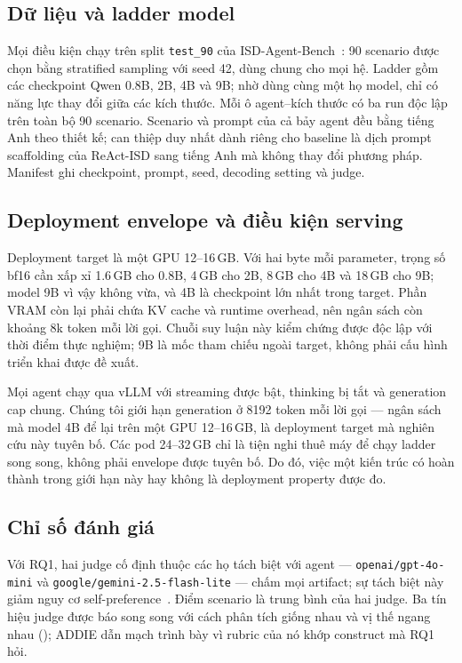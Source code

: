 \subsection{Dữ liệu và ladder model}
\label{sec:dataset}
\label{sec:setup}

Mọi điều kiện chạy trên split \texttt{test\_90} của
ISD-Agent-Bench~\cite{isdagentbench}: 90 scenario được chọn bằng stratified
sampling với seed 42, dùng chung cho mọi hệ. Ladder gồm các checkpoint Qwen
0.8B, 2B, 4B và 9B; nhờ dùng cùng một họ model, chỉ có năng lực thay đổi giữa các
kích thước. Mỗi ô agent--kích thước có ba run độc lập trên toàn bộ 90 scenario.
Scenario và prompt của cả bảy agent đều bằng tiếng Anh theo thiết kế; can thiệp
duy nhất dành riêng cho baseline là dịch prompt scaffolding của ReAct-ISD sang
tiếng Anh mà không thay đổi phương pháp. Manifest ghi checkpoint, prompt, seed,
decoding setting và judge.

\subsection{Deployment envelope và điều kiện serving}
\label{sec:assumptions}

Deployment target là một GPU 12--16\,GB. Với hai byte mỗi parameter, trọng số
bf16 cần xấp xỉ 1.6\,GB cho 0.8B, 4\,GB cho 2B, 8\,GB cho 4B và 18\,GB cho 9B;
model 9B vì vậy không vừa, và 4B là checkpoint lớn nhất trong target. Phần VRAM
còn lại phải chứa KV cache và runtime overhead, nên ngân sách còn khoảng 8k token
mỗi lời gọi. Chuỗi suy luận này kiểm chứng được độc lập với thời điểm thực
nghiệm; 9B là mốc tham chiếu ngoài target, không phải cấu hình triển khai được đề
xuất.

Mọi agent chạy qua vLLM với streaming được bật, thinking bị tắt và generation cap
chung. Chúng tôi giới hạn generation ở 8192 token mỗi lời gọi --- ngân sách mà model 4B để lại trên một GPU 12--16\,GB, là deployment target mà nghiên cứu này tuyên bố. Các pod 24--32\,GB chỉ là tiện nghi thuê máy để chạy ladder song song, không phải envelope được tuyên bố.
Do đó, việc một kiến trúc có hoàn thành trong giới hạn này hay không là deployment
property được đo.

\subsection{Chỉ số đánh giá}
\label{sec:metrics}

Với RQ1, hai judge cố định thuộc các họ tách biệt với agent ---
\texttt{openai/gpt-4o-mini} và \texttt{google/gemini-2.5-flash-lite} --- chấm mọi
artifact; sự tách biệt này giảm nguy cơ
self-preference~\cite{panickssery2024llm}. Điểm scenario là trung bình của hai
judge. Ba tín hiệu judge được báo song song với cách phân tích giống nhau và vị
thế ngang nhau (); ADDIE dẫn mạch trình bày vì rubric của
nó khớp construct mà RQ1 hỏi.

